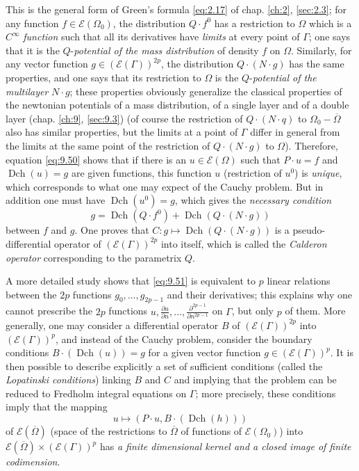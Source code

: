 \documentclass[12pt,a4paper,leqno,twoside]{extbook}
\newcommand{\Dch}{\operatorname{Dch}}
\newcommand{\pder}[2]{\frac{\partial #1}{\partial #2}}
\begin{document}
This is the general form of Green's formula \eqref{eq:2.17} of chap. \ref{ch:2}, \ref{sec:2.3}; for any function \(f \in \mathcal{E}(\Omega_0)\), the distribution \(Q \cdot f^0\) has a restriction to \(\Omega\) which is a \(C^\infty\) \emph{function} such that all its derivatives have \emph{limits} at every point of \(\Gamma\); one says that it is the \(Q\)-\emph{potential of the mass distribution} of density \(f\) on \(\Omega\). Similarly, for any vector function \(g \in (\mathcal{E}(\Gamma))^{2p}\), the distribution \(Q \cdot (N \cdot g)\) has the same properties, and one says that its restriction to \(\Omega\) is the \(Q\)-\emph{potential of the multilayer} \(N \cdot g\); these properties obviously generalize the classical properties of the newtonian potentials of a mass distribution, of a single layer and of a double layer (chap. \ref{ch:9}, \ref{sec:9.3}) (of course the restriction of \(Q \cdot (N \cdot q)\) to \(\Omega_0 - \overline{\Omega}\) also has similar properties, but the limits at a point of \(\Gamma\) differ in general from the limits at the same point of the restriction of \(Q \cdot (N \cdot g)\) to \(\Omega\)). Therefore, equation \eqref{eq:9.50} shows that if there is an \(u \in \mathcal{E}(\Omega)\) such that \(P \cdot u = f\) and \(\Dch(u) = g\) are given functions, this function \(u\) (restriction of \(u^0\)) is \emph{unique}, which corresponds to what one may expect of the Cauchy problem. But in addition one must have \(\Dch(u^0) = g\), which gives the \emph{necessary condition}
\begin{equation}
    \label{eq:9.51}
    g = \Dch(Q \cdot f^0) + \Dch(Q \cdot (N \cdot g))
\end{equation}
between \(f\) and \(g\). One proves that \(C: g \mapsto \Dch(Q \cdot (N \cdot g))\) is a pseudo-differential operator of \((\mathcal{E}(\Gamma))^{2p}\) into itself, which is called the \emph{Calderon operator} corresponding to the parametrix \(Q\).

A more detailed study shows that \eqref{eq:9.51} is equivalent to \(p\) linear relations between the \(2p\) functions \(g_0, \ldots, g_{2p-1}\) and their derivatives; this explains why one cannot prescribe the \(2p\) functions \(u, \pder{u}{n}, \ldots, \pder{^{2p-1}}{n^{2p-1}}\) on \(\Gamma\), but only \(p\) of them. More generally, one may consider a differential operator \(B\) of \((\mathcal{E}(\Gamma))^{2p}\) into \((\mathcal{E}(\Gamma))^p\), and instead of the Cauchy problem, consider the boundary conditions \(B \cdot (\Dch(u)) = g\) for a given vector function \(g \in (\mathcal{E}(\Gamma))^p\). It is then possible to describe explicitly a set of sufficient conditions (called the \emph{Lopatinski conditions}) linking \(B\) and \(C\) and implying that the problem can be reduced to Fredholm integral equations on \(\Gamma\); more precisely, these conditions imply that the mapping
\begin{equation}
    \label{eq:9.52}
    u \mapsto (P \cdot u, B \cdot (\Dch(h)))
\end{equation}
of \(\mathcal{E}(\overline{\Omega})\) (space of the restrictions to \(\overline{\Omega}\) of functions of \(\mathcal{E}(\Omega_0)\)) into \(\mathcal{E}(\overline{\Omega}) \times (\mathcal{E}(\Gamma))^p\) has \emph{a finite dimensional kernel and a closed image of finite codimension}.
\end{document}
